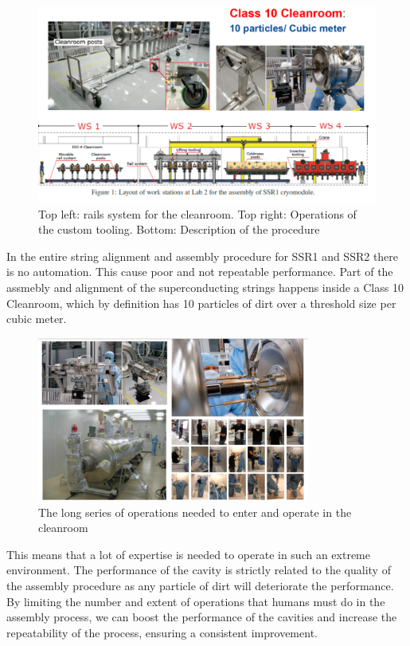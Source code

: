 \documentclass[12pt,a4paper]{article}
\begin{document}
\begin{figure}[h!]
\centering
\includegraphics[width=1\textwidth]{4.png}
\caption{Top left: rails system for the cleanroom. Top right: Operations of the custom tooling. Bottom: Description of the procedure}
\end{figure}



In the entire string alignment and assembly procedure for SSR1 and SSR2 there is no automation. This cause poor and not repeatable performance. 
Part of the assmebly and alignment of the superconducting strings happens inside a Class 10 Cleanroom, which by definition has 10 particles of dirt over a threshold size per cubic meter. \newline


\clearpage
\newpage

\begin{figure}[ht]
\centering
\includegraphics[width=0.8\textwidth]{5.png}
\caption{The long series of operations needed to enter and operate in the cleanroom}
\end{figure}


This means that a lot of expertise is needed to operate in such an extreme environment. The performance of the cavity is strictly related to the quality of the assembly procedure as any particle of dirt will deteriorate the performance.\newline 
By limiting the number and extent of operations that humans must do in the assembly process, we can boost the performance of the cavities and increase the repeatability of the process, ensuring a consistent improvement.
\end{document}
